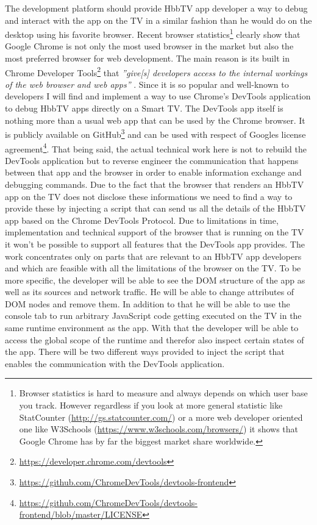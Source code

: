 The development platform should provide HbbTV app developer a way to debug and interact with the app on the TV in a
similar fashion than he would do on the desktop using his favorite browser. Recent browser statistics\footnote{Browser
statistics is hard to measure and always depends on which user base you track. However regardless if you look at more
general statistic like StatCounter (\url{http://gs.statcounter.com/}) or a more web developer oriented one like
W3Schools (\url{https://www.w3schools.com/browsers/}) it shows that Google Chrome has by far the biggest market
share worldwide.} clearly show that Google Chrome is not only the most used browser in the market but also the most
preferred browser for web development. The main reason is its built in Chrome Developer Tools\footnote{\url{https://developer.chrome.com/devtools}}
that \textit{''give[s] developers access to the internal workings of the web browser and web apps''} \cite{devtools}.
Since it is so popular and well-known to developers I will find and implement a way to use Chrome's DevTools
application to debug HbbTV apps directly on a Smart TV. The DevTools app itself is nothing more than a usual web app
that can be used by the Chrome browser. It is publicly available on GitHub\footnote{\url{https://github.com/ChromeDevTools/devtools-frontend}}
and can be used with respect of Googles license agreement\footnote{\url{https://github.com/ChromeDevTools/devtools-frontend/blob/master/LICENSE}}.
That being said, the actual technical work here is not to rebuild the DevTools application but to reverse
engineer the communication that happens between that app and the browser in order to enable information exchange
and debugging commands. Due to the fact that the browser that renders an HbbTV app on the TV does not disclose
these informations we need to find a way to provide these by injecting a script that can send us all the details
of the HbbTV app based on the Chrome DevTools Protocol. Due to limitations in time, implementation and
technical support of the browser that is running on the TV it won't be possible to support all features
that the DevTools app provides. The work concentrates only on parts that are relevant to an HbbTV app
developers and which are feasible with all the limitations of the browser on the TV. To be more specific,
the developer will be able to see the DOM structure of the app as well as its sources and network traffic.
He will be able to change attributes of DOM nodes and remove them. In addition to that he will be able to
use the console tab to run arbitrary JavaScript code getting executed on the TV in the same runtime environment
as the app. With that the developer will be able to access the global scope of the runtime and therefor
also inspect certain states of the app. There will be two different ways provided to inject the script that
enables the communication with the DevTools application.

